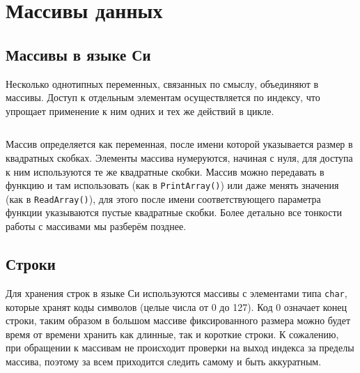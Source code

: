\chapter{Массивы данных}


\section{Массивы в языке Си}

Несколько однотипных переменных, связанных по смыслу, объединяют в массивы.
Доступ к отдельным элементам осуществляется по индексу, что упрощает
применение к ним одних и тех же действий в цикле.
%
\inputminted{c}{samples/array.c}

Массив определяется как переменная, после имени которой указывается размер в
квадратных скобках. Элементы массива нумеруются, начиная с нуля, для доступа к
ним используются те же квадратные скобки. Массив можно передавать в функцию и
там использовать (как в \verb|PrintArray()|) или даже менять значения
(как в \verb|ReadArray()|), для этого после имени соответствующего параметра
функции указываются пустые квадратные скобки. Более детально все тонкости
работы с массивами мы разберём позднее.


\section{Строки}

Для хранения строк в языке Си используются массивы с элементами типа
\texttt{char}, которые хранят коды символов (целые числа от 0 до 127). Код 0
означает конец строки, таким образом в большом массиве фиксированного размера
можно будет время от времени хранить как длинные, так и короткие строки. К
сожалению, при обращении к массивам не происходит проверки на выход индекса за
пределы массива, поэтому за всем приходится следить самому и быть аккуратным.
%
\inputminted{c}{samples/string.c}

